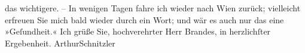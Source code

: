 \begin{ledgroupsized}[t]{13cm}
                    das wichtigere. –\pend
           \pstart
           In wenigen Tagen fahre ich wieder nach Wien
                    zurück; vielleicht erfreuen Sie mich bald wieder durch ein Wort; und wär es auch
                    nur das eine »Geſundheit.«\pend
           \pstart Ich grüße Sie, hochverehrter Herr Brandes, in herzlichſter Ergebenheit.
                        \spacefill\mbox{ArthurSchnitzler}\pend{}\endnumbering{}\end{ledgroupsized}  \newcommand{\dateiname}{L00705}\newcommand{\titel}{Arthur Schnitzler an Georg Brandes, 18. 7. 1897}\newcommand{\editorInnen}{Martin Anton Müller und Gerd-Hermann Susen}
      